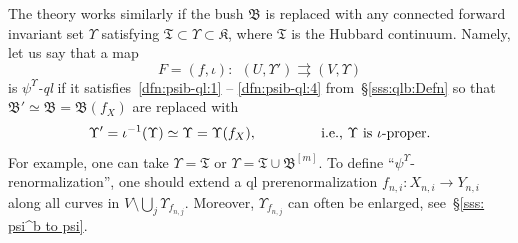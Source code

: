 \documentclass{amsart}
\newcommand{\filled}{{\mathfrak K }}
\newcommand{\Hub}{{\mathfrak T}}
\newcommand{\bush}{{\mathfrak B }}
\newcommand{\bbush}{{\boldsymbol {\mathfrak B} }}
\renewcommand{\sp}{{\ \ }}
\newcommand{\1}{{\mathbb 1 }}
\begin{document}
\begin{rem}\label{rem:general constr} The theory works similarly if the bush $\bush$ is replaced with any connected forward invariant set $\Upsilon$ satisfying $\Hub\subset \Upsilon\subset \filled$, where $\Hub$  is the Hubbard continuum. Namely, let us say that a map
\begin{equation}
\label{eq:psi^* ql map}
F=(f,\iota)\colon \sp ( U,  \Upsilon')  \rightrightarrows (V, \Upsilon )
\end{equation} is \emph{$\psi^\Upsilon$-ql}
if it satisfies~\ref{dfn:psib-ql:1} -- \ref{dfn:psib-ql:4} from~\S\ref{sss:qlb:Defn} so that $\bush'\simeq \bush=\bush(f_X)$ are replaced with \[\Upsilon'=\iota^{-1} (\Upsilon)\simeq \Upsilon=\Upsilon(f_X),\hspace{1.5cm}\text{ i.e., }\Upsilon \text{ is $\iota$-proper}.\] For example, one can take $\Upsilon =\Hub$ or $\Upsilon=\Hub\cup \bbush^{[m]}$. To define ``$\psi^\Upsilon$-renormalization'', one should extend a ql prerenormalization  $f_{n,i}\colon {X_{n,i} \to Y_{n,i}}$ along all curves in $V\setminus  \bigcup_{j}  \Upsilon_{f_{n,j}}$. Moreover, $\Upsilon_{f_{n,j}}$ can often be enlarged, see~\S\ref{sss: psi^b to psi}.
\end{rem}
\end{document}
